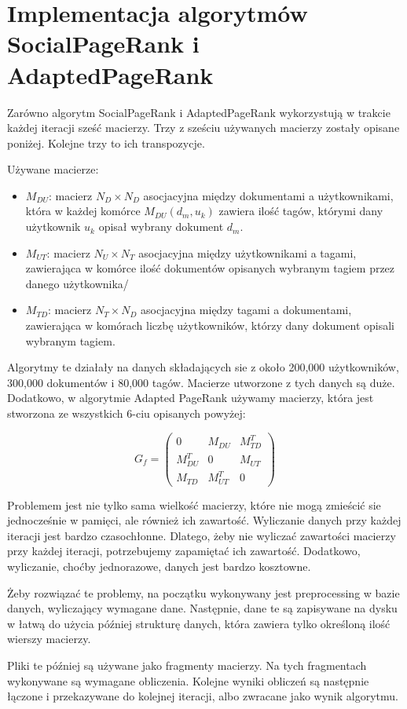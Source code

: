 \section{Implementacja algorytmów SocialPageRank i AdaptedPageRank}

Zarówno algorytm SocialPageRank i AdaptedPageRank wykorzystują w trakcie każdej iteracji sześć macierzy. Trzy z sześciu używanych macierzy zostały opisane poniżej.  Kolejne trzy to ich transpozycje.

Używane macierze:

\begin{itemize}
\item $M_{DU}$: macierz $N_D \times N_D$ asocjacyjna między dokumentami a użytkownikami, która w każdej komórce $M_{DU}(d_m, u_k)$ zawiera ilość tagów, którymi dany użytkownik $u_k$ opisał wybrany dokument $d_m$.
\item $M_{UT}$: macierz $N_U \times N_T$  asocjacyjna między użytkownikami a tagami, zawierająca w komórce ilość dokumentów opisanych wybranym tagiem przez danego użytkownika/
\item $M_{TD}$: macierz $N_T \times N_D$ asocjacyjna między tagami a dokumentami, zawierająca w komórach liczbę użytkowników, którzy dany dokument opisali wybranym tagiem.

\end{itemize}

Algorytmy te działały na danych składających sie z około 200,000 użytkowników, 300,000 dokumentów i 80,000 tagów. Macierze utworzone z tych danych są duże. Dodatkowo, w algorytmie Adapted PageRank używamy macierzy, która jest stworzona ze wszystkich 6-ciu opisanych powyżej:

\[
 G_f =
 \begin{pmatrix}
  0                     & M_{DU}       & M_{TD}^T \\
  M_{DU}^T  & 0                     & M_{UT}     \\
  M_{TD}       & M_{UT}^T   & 0 
 \end{pmatrix}
\]

Problemem jest nie tylko sama wielkość macierzy, które nie mogą zmieścić sie jednocześnie w pamięci, ale również ich zawartość. Wyliczanie danych przy każdej iteracji jest bardzo czasochłonne. Dlatego, żeby nie wyliczać zawartości macierzy przy każdej iteracji, potrzebujemy zapamiętać ich zawartość. Dodatkowo, wyliczanie, choćby jednorazowe, danych jest bardzo kosztowne.

Żeby rozwiązać te problemy, na początku wykonywany jest preprocessing w bazie danych, wyliczający wymagane dane. Następnie, dane te są zapisywane na dysku w łatwą do użycia później strukturę danych, która zawiera tylko określoną ilość wierszy macierzy.


Pliki te później są używane jako fragmenty macierzy. Na tych fragmentach wykonywane są wymagane obliczenia. Kolejne wyniki obliczeń są następnie łączone i przekazywane do kolejnej iteracji, albo zwracane jako wynik algorytmu.


